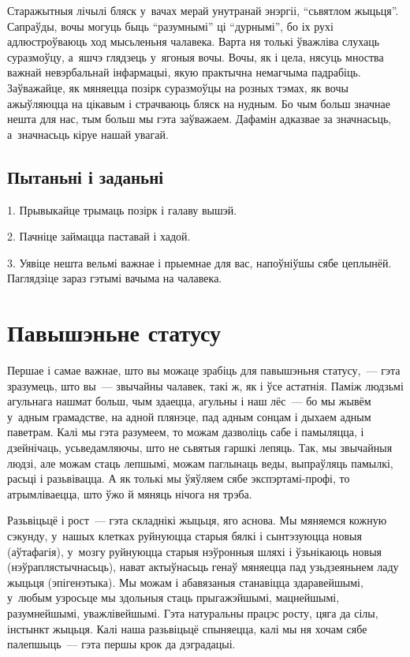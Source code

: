 Старажытныя лічылі бляск у~вачах мерай унутранай энэргіі, ``сьвятлом жыцьця''. Сапраўды, вочы могуць быць ``разумнымі'' ці ``дурнымі'', бо іх рухі адлюстроўваюць ход мысьленьня чалавека. Варта ня толькі ўважліва слухаць суразмоўцу, а~яшчэ глядзець у~ягоныя вочы. Вочы, як і цела, нясуць мноства важнай невэрбальнай інфармацыі, якую практычна немагчыма падрабіць. Заўважайце, як мяняецца позірк суразмоўцы на розных тэмах, як вочы ажыўляюцца на цікавым і страчваюць бляск на нудным. Бо чым больш значнае нешта для нас, тым больш мы гэта заўважаем. Дафамін адказвае за значнасьць, а~значнасьць кіруе нашай увагай.

\subsection*{Пытаньні і заданьні}

1. Прывыкайце трымаць позірк і галаву вышэй.

2. Пачніце займацца паставай і хадой.

3. Уявіце нешта вельмі важнае і прыемнае для вас, напоўніўшы сябе цеплынёй. Паглядзіце зараз гэтымі вачыма на чалавека.


\section{Павышэньне статусу}

Першае і самае важнае, што вы можаце зрабіць для павышэньня статусу,~--- гэта зразумець, што вы~--- звычайны чалавек, такі ж, як і ўсе астатнія. Паміж людзьмі агульнага нашмат больш, чым здаецца, агульны і наш лёс~--- бо мы жывём у~адным грамадстве, на адной плянэце, пад адным сонцам і дыхаем адным паветрам. Калі мы гэта разумеем, то можам дазволіць сабе і памыляцца, і дзейнічаць, усьведамляючы, што не сьвятыя гаршкі лепяць. Так, мы звычайныя людзі, але можам стаць лепшымі, можам паглынаць веды, выпраўляць памылкі, расьці і разьвівацца. А як толькі мы ўяўляем сябе экспэртамі-профі, то атрымліваецца, што ўжо й мяняць нічога ня трэба.

Разьвіцьцё і рост~--- гэта складнікі жыцьця, яго аснова. Мы мяняемся кожную сэкунду, у~нашых клетках руйнуюцца старыя бялкі і сынтэзуюцца новыя (аўтафагія), у~мозгу руйнуюцца старыя нэўронныя шляхі і ўзьнікаюць новыя (нэўраплястычнасьць), нават актыўнасьць генаў мяняецца пад узьдзеяньнем ладу жыцьця (эпігенэтыка). Мы можам і абавязаныя станавіцца здаравейшымі, у~любым узросьце мы здольныя стаць прыгажэйшымі, мацнейшымі, разумнейшымі, уважлівейшымі. Гэта натуральны працэс росту, цяга да сілы, інстынкт жыцьця. Калі наша разьвіцьцё спыняецца, калі мы ня хочам сябе палепшыць~--- гэта першы крок да дэградацыі.

